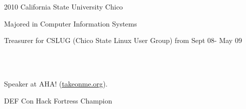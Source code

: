 \documentclass[]{SBResume}
\begin{document}
\begin{resume}
\newpage   
{}
      \resumeentry
      {2010}
      {}{California State University Chico}{}
      {
	 \begin{resumeitemize}
         \item{Majored in Computer Information Systems}
         \item{Treasurer for CSLUG (Chico State Linux User Group) from Sept 08- May 09}
	 \end{resumeitemize}
      }
\\
\\
      \begin{resumeitemize}
          \item{Speaker at AHA! (\href{http://takeonme.org}{\underline{takeonme.org}}).}
          \item{DEF Con \MakeUppercase{}  Hack Fortress Champion}
      \end{resumeitemize}
\end{resume}
\end{document}
